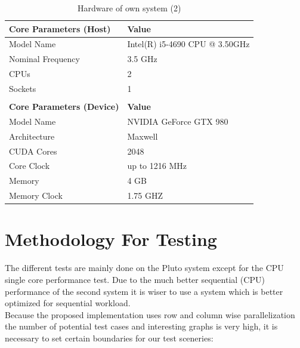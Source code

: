 \documentclass[draft, final]{vutinfth} %
\begin{document}
		\begin{table}[!ht]
		\centering
		\caption{Hardware of own system (2)}
		\begin{tabular}{ll}
		\hline
		\multicolumn{1}{|l|}{\textbf{Core Parameters (Host)}}   & \multicolumn{1}{l|}{\textbf{Value}}                                  \\ \hline
		\multicolumn{1}{|l|}{Model Name}               & \multicolumn{1}{l|}{Intel(R) i5-4690 CPU @ 3.50GHz} \\ \hline
		\multicolumn{1}{|l|}{Nominal Frequency}        & \multicolumn{1}{l|}{3.5 GHz}                                \\ \hline
		\multicolumn{1}{|l|}{CPUs}                     & \multicolumn{1}{l|}{2}                                      \\ \hline
		\multicolumn{1}{|l|}{Sockets}                  & \multicolumn{1}{l|}{1}                                      \\ \hline
		                                               &                                                             \\ \hline
		\multicolumn{1}{|l|}{\textbf{Core Parameters (Device)}} & \multicolumn{1}{l|}{\textbf{Value}}                                  \\ \hline
		\multicolumn{1}{|l|}{Model Name}               & \multicolumn{1}{l|}{NVIDIA GeForce GTX 980}                 \\ \hline
		\multicolumn{1}{|l|}{Architecture}             & \multicolumn{1}{l|}{Maxwell}                                \\ \hline
		\multicolumn{1}{|l|}{CUDA Cores}               & \multicolumn{1}{l|}{2048}                                   \\ \hline
		\multicolumn{1}{|l|}{Core Clock}               & \multicolumn{1}{l|}{up to 1216 MHz}                         \\ \hline
		\multicolumn{1}{|l|}{Memory}                   & \multicolumn{1}{l|}{4 GB}                                   \\ \hline
		\multicolumn{1}{|l|}{Memory Clock}             & \multicolumn{1}{l|}{1.75 GHZ}                                  \\ \hline
		\end{tabular}
		\end{table}

	\section{Methodology For Testing}
	\label{sec:methodology_for_testing}
		The different tests are mainly done on the Pluto system except for the CPU single core performance test. Due to the much better sequential (CPU) performance of the second system it is wiser to use a system which is better optimized for sequential workload.\\
		Because the proposed implementation uses row and column wise parallelization the number of potential test cases and interesting graphs is very high, it is necessary to set certain boundaries for our test sceneries:
\end{document}

